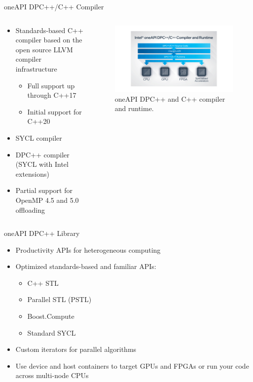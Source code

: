 \documentclass[aspectratio=169]{beamer}
\begin{document}
\begin{frame}{oneAPI DPC++/C++ Compiler}
\begin{columns}
\begin{column}{0.5\textwidth}
\begin{itemize}
  \item Standards-based C++ compiler based on the open source LLVM compiler infrastructure
  \begin{itemize}
    \item Full support up through C++17
    \item Initial support for C++20
  \end{itemize}
  \item SYCL compiler
  \item DPC++ compiler (SYCL with Intel extensions)
  \item Partial support for OpenMP 4.5 and 5.0 offloading
\end{itemize}
\end{column}
\begin{column}{0.5\textwidth}
\begin{figure}
  \includegraphics[width=\linewidth]{figures/diagram-oneapi-dpc-c-compiler-16x9.png}
  \caption{oneAPI DPC++ and C++ compiler and runtime.}
\end{figure}
\end{column}
\end{columns}
\end{frame}

\begin{frame}{oneAPI DPC++ Library}
\begin{itemize}
  \item Productivity APIs for heterogeneous computing
  \item Optimized standards-based and familiar APIs:
  \begin{itemize}
    \item C++ STL
    \item Parallel STL (PSTL)
    \item Boost.Compute
    \item Standard SYCL
  \end{itemize}
  \item Custom iterators for parallel algorithms
  \item Use device and host containers to target GPUs and FPGAs or run your code across multi-node CPUs
\end{itemize}
\end{frame}
\end{document}
